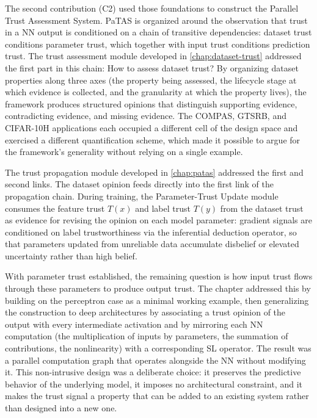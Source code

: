 The second contribution (C2) used those foundations to construct the Parallel Trust Assessment System. PaTAS is organized around the observation that trust in a \ac{NN} output is conditioned on a chain of transitive dependencies: dataset trust conditions parameter trust, which together with input trust conditions prediction trust. The trust assessment module developed in \cref{chap:dataset-trust} addressed the first part in this chain: How to assess dataset trust? By organizing dataset properties along three axes (the property being assessed, the lifecycle stage at which evidence is collected, and the granularity at which the property lives), the framework produces structured opinions that distinguish supporting evidence, contradicting evidence, and missing evidence. The \ac{COMPAS}, \ac{GTSRB}, and CIFAR-10H applications each occupied a different cell of the design space and exercised a different quantification scheme, which made it possible to argue for the framework's generality without relying on a single example.

The trust propagation module developed in \cref{chap:patas} addressed the first and second links. The dataset opinion feeds directly into the first link of the propagation chain. During training, the Parameter-Trust Update module consumes the feature trust $T(x)$ and label trust $T(y)$ from the dataset trust as evidence for revising the opinion on each model parameter: gradient signals are conditioned on label trustworthiness via the inferential deduction operator, so that parameters updated from unreliable data accumulate disbelief or elevated uncertainty rather than high belief. 

With parameter trust established, the remaining question is how input trust flows through these parameters to produce output trust. The chapter addressed this by building on the perceptron case as a minimal working example, then generalizing 
the construction to deep architectures by associating a trust opinion of the output with every intermediate activation and by mirroring each \ac{NN} computation (the multiplication of inputs by parameters, the summation of contributions, the nonlinearity) with a corresponding \ac{SL} operator. The result was a parallel computation graph that operates alongside the \ac{NN} without modifying it. This non-intrusive design was a deliberate choice: it preserves the predictive behavior of the underlying model, it imposes no architectural constraint, and it makes the trust signal a property that can be added to an existing system rather than designed into a new one. 

